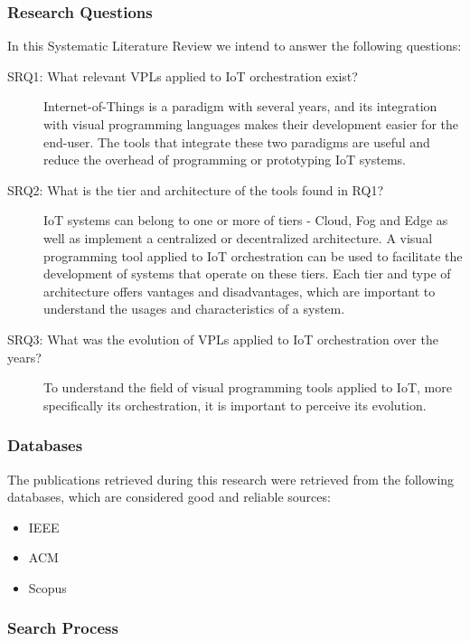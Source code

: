 \subsubsection{Research Questions}\label{sec:slr_research_questions}

In this Systematic Literature Review we intend to answer the following questions:

\begin{description}
    \item [SRQ1: What relevant VPLs applied to IoT orchestration exist?] Internet-of-Things is a paradigm with several years, and its integration with visual programming languages makes their development easier for the end-user. The tools that integrate these two paradigms are useful and reduce the overhead of programming or prototyping IoT systems.
    \item [SRQ2: What is the tier and architecture of the tools found in RQ1?] IoT systems can belong to one or more of tiers - Cloud, Fog and Edge as well as implement a centralized or decentralized architecture. A visual programming tool applied to IoT orchestration can be used to facilitate the development of systems that operate on these tiers. Each tier and type of architecture offers vantages and disadvantages, which are important to understand the usages and characteristics of a system.
    \item [SRQ3: What was the evolution of VPLs applied to IoT orchestration over the years?] To understand the field of visual programming tools applied to IoT, more specifically its orchestration, it is important to perceive its evolution.
\end{description}

\subsubsection{Databases}\label{sec:databases}

The publications retrieved during this research were retrieved from the following databases, which are considered good and reliable sources:

\begin{itemize}
    \item IEEE
    \item ACM
    \item Scopus
\end{itemize}{}

\subsubsection{Search Process}\label{sec:process}

